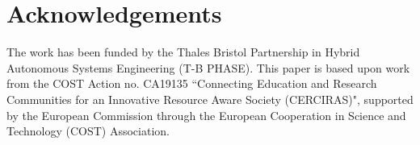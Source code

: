 \section{Acknowledgements}
The work has been funded by the Thales Bristol Partnership in Hybrid Autonomous Systems Engineering (T-B PHASE).
%
This paper is based upon work from the COST Action no. CA19135 ``Connecting Education and Research Communities for an Innovative Resource Aware Society (CERCIRAS)", supported by the European Commission through the European Cooperation in Science and Technology (COST) Association.

